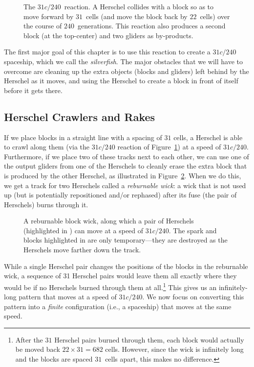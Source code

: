 \begin{figure}[!htb]
	\centering{}
	\caption{The $31c/240$~reaction. A Herschel collides with a block so as to move forward by $31$~cells (and move the block back by $22$~cells) over the course of $240$~generations. This reaction also produces a second block (at the top-center) and two gliders as by-products.}\label{fig:31c_240_reaction}
\end{figure}

The first major goal of this chapter is to use this reaction to create a $31c/240$ spaceship, which we call the \emph{silverfish}. The major obstacles that we will have to overcome are cleaning up the extra objects (blocks and gliders) left behind by the Herschel as it moves, and using the Herschel to create a block in front of itself before it gets there.


\subsection{Herschel Crawlers and Rakes}\label{sec:silverfish_herschel_crawler}

If we place blocks in a straight line with a spacing of $31$ cells, a Herschel is able to crawl along them (via the $31c/240$ reaction of Figure~\ref{fig:31c_240_reaction}) at a speed of $31c/240$. Furthermore, if we place two of these tracks next to each other, we can use one of the output gliders from one of the Herschels to cleanly erase the extra block that is produced by the other Herschel, as illustrated in Figure~\ref{fig:31c_240_herschel_pair}. When we do this, we get a track for two Herschels called a \emph{reburnable wick}: a wick that is not used up (but is potentially repositioned and/or rephased) after its fuse (the pair of Herschels) burns through it.

\begin{figure}[!htb]
	\centering
	\caption{A reburnable block wick, along which a pair of Herschels (highlighted in ) can move at a speed of $31c/240$. The spark and blocks highlighted in  are only temporary---they are destroyed as the Herschels move farther down the track.}\label{fig:31c_240_herschel_pair}
\end{figure}

While a single Herschel pair changes the positions of the blocks in the reburnable wick, a sequence of 31 Herschel pairs would leave them all exactly where they would be if no Herschels burned through them at all.\footnote{After the $31$ Herschel pairs burned through them, each block would actually be moved back $22 \times 31 = 682$ cells. However, since the wick is infinitely long and the blocks are spaced $31$~cells apart, this makes no difference.} This gives us an infinitely-long pattern that moves at a speed of $31c/240$. We now focus on converting this pattern into a \emph{finite} configuration (i.e., a spaceship) that moves at the same speed.

